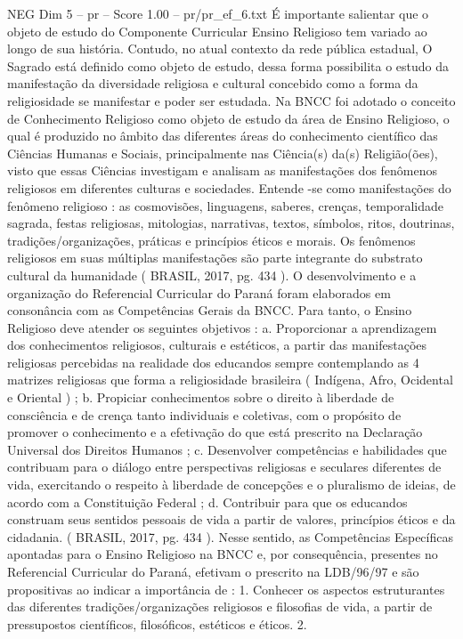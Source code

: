 \begin{textsample}{NEG Dim 5 – pr – Score 1.00 – pr/pr\_ef\_6.txt}
É importante salientar que o objeto de estudo do Componente Curricular Ensino Religioso tem variado ao longo de sua história.
Contudo, no atual contexto da rede pública estadual, O Sagrado está definido como objeto de estudo, dessa forma possibilita o estudo da manifestação da diversidade religiosa e cultural concebido como a forma da religiosidade se manifestar e poder ser estudada.
Na BNCC foi adotado o conceito de Conhecimento Religioso como objeto de estudo da área de Ensino Religioso, o qual é produzido no âmbito das diferentes áreas do conhecimento científico das Ciências Humanas e Sociais, principalmente nas Ciência(s) da(s) Religião(ões), visto que essas Ciências investigam e analisam as manifestações dos fenômenos religiosos em diferentes culturas e sociedades.
Entende -se como manifestações do fenômeno religioso : as cosmovisões, linguagens, saberes, crenças, temporalidade sagrada, festas religiosas, mitologias, narrativas, textos, símbolos, ritos, doutrinas, tradições/organizações, práticas e princípios éticos e morais.
Os fenômenos religiosos em suas múltiplas manifestações são parte integrante do substrato cultural da humanidade ( BRASIL, 2017, pg. 434 ).
O desenvolvimento e a organização do Referencial Curricular do Paraná foram elaborados em consonância com as Competências Gerais da BNCC.
Para tanto, o Ensino Religioso deve atender os seguintes objetivos : a.
Proporcionar a aprendizagem dos conhecimentos religiosos, culturais e estéticos, a partir das manifestações religiosas percebidas na realidade dos educandos sempre contemplando as 4 matrizes religiosas que forma a religiosidade brasileira ( Indígena, Afro, Ocidental e Oriental ) ; b.
Propiciar conhecimentos sobre o direito à liberdade de consciência e de crença tanto individuais e coletivas, com o propósito de promover o conhecimento e a efetivação do que está prescrito na Declaração Universal dos Direitos Humanos ; c.
Desenvolver competências e habilidades que contribuam para o diálogo entre perspectivas religiosas e seculares diferentes de vida, exercitando o respeito à liberdade de concepções e o pluralismo de ideias, de acordo com a Constituição Federal ; d.
Contribuir para que os educandos construam seus sentidos pessoais de vida a partir de valores, princípios éticos e da cidadania. ( BRASIL, 2017, pg. 434 ).
Nesse sentido, as Competências Específicas apontadas para o Ensino Religioso na BNCC e, por consequência, presentes no Referencial Curricular do Paraná, efetivam o prescrito na LDB/96/97 e são propositivas ao indicar a importância de : 1.
Conhecer os aspectos estruturantes das diferentes tradições/organizações religiosos e filosofias de vida, a partir de pressupostos científicos, filosóficos, estéticos e éticos. 2.

\end{textsample}
